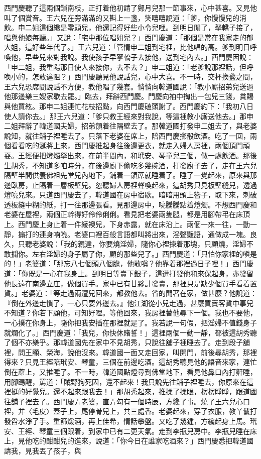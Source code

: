 西門慶聽了這兩個鎖南枝，正打着他初請了鄭月兒那一節事來，心中甚喜。又見他叫了個賞音。王六兒在旁滿滿的又斟上一盞，笑嘻嘻說道：「爹，你慢慢兒的消飲。申二姐這個纔是零頭兒，他還記得好些小令兒哩。到明日閒了，拏轎子接了，唱與他娘每聽。」又說：「宅中那位唱姐兒？」西門慶道：「那個是常在我家走的郁大姐，這好些年代了。」王六兒道：「管情申二姐到宅裡，比他唱的高。爹到明日呼喚他，早些兒來對我說。我使孩子早拏轎子去接他，送到宅內去。」西門慶因說：「申二姐，我重陽那日使人來接你，去不去？」申二姐道：「老爹說那裡話，但呼喚小的，怎敢違阻？」西門慶聽見他說話兒，心中大喜。不一時，交杯換盞之間，王六兒恐席間說話不方便，教他唱了幾套。悄悄向韓道國說：「教小廝招弟兒送過他那邊樂三嫂家歇去罷。」臨去，拜辭西門慶。門慶向袖中掏出一包兒三錢，賞賜與他買絃。那申二姐連忙花枝招颭，向西門慶磕頭謝了。西門慶約下：「我初八日使人請你去。」那王六兒道：「爹只教王經來對我說，等這裡教小廝送他去。」那申二姐拜辭了韓道國夫婦，招弟領着往隔壁去了。那韓道國打發申二姐去了，與老婆說知，就往舖子裡睡去了。只落下老婆在席上，陪西門慶擲骰飲酒。吃了一回，兩個看看吃的涎將上來，西門慶推起身往後邊更衣，就走入婦人房裡，兩個頂門頑耍。王經便把燈燭拏出來，在前半間內，和玳安、琴童兒三個，做一處飲酒。那後生胡秀，不知道多咱時分，在後邊廚下偷吃多幾碗酒，打發廚子去了，走在王六兒隔壁半間供養佛祖先堂兒內地下，鋪着一領蓆就睡着了。睡了一覺起來，原來與那邊臥房，止隔着一層板壁兒。忽聽婦人房裡聲喚起來，這胡秀只見板壁縫兒，透過燈喨兒來。只道西門慶去了，韓道國在房中宿歇。暗暗用頭上簪子，取下來，刺破透板縫中糊的紙，打一往那邊張看。見那邊房中，喨騰騰點着燈燭。不想西門慶和老婆在屋裡，兩個正幹得好伶伶俐俐。看見把老婆兩隻腿，都是用腳帶弔在床頂上。西門慶上身止着一件綾襖兒，下身赤露，就在床沿上。兩個一來一往，一動一靜，搧打的連身响喨。老婆口裡百般言語都叫將出來，淫聲豔語，通做成一塊。良久，只聽老婆說：「我的親達，你要燒淫婦，隨你心裡揀着那塊，只顧燒，淫婦不敢攔你。左右淫婦的身子屬了你，顧的那些兒了。」西門慶道：「只怕你家裡的嗔是的！」老婆道：「那忘八七個頭八個膽，他敢嗔？他靠着那裡過日子哩！」西門慶道：「你既是一心在我身上。到明日等賣下銀子，這遭打發他和來保起身，亦發留他長遠在南邊立庄，做個買手。家中已有甘夥計發賣，那裡只是缺少個買手看着置貨。」老婆道：「等走過兩遭兒回來，都教他去。省的閒著在家，做甚麼？他說道：『倒在外邊走慣了，一心只要外邊去。』他江湖從小兒走過，甚麼買賣客貨中事兒不知道？你若下顧他，可知好哩。等他回來，我房裡替他尋下一個。我也不要他，一心撲在你身上，隨你把我安插在那裡就是了。我若說一句假，把淫婦不值錢身子就爛化了。」西門慶道：「我兒，你快休賭誓！」這裡兩個一動一靜，都被這胡秀聽了個不亦樂乎。那韓道國先在家中不見胡秀，只說往舖子裡睡去了。走到段子舖裡，問王顯、榮海，說他沒來。韓道國一面又走回家，叫開門，前後尋胡秀，那裡得來？只見王經陪玳安、琴童，三個在前邊吃酒。這胡秀聽見他的語音來家，連忙倒在蓆上，又推睡了。不一時，韓道國點燈尋到佛堂地下，看見他鼻口內打鼾睡，用腳踢醒，罵道：「賊野狗死囚，還不起來！我只說先往舖子裡睡去，你原來在這裡挺的好覺兒。還不起來跟我去！」那胡秀起來，推揉了揉眼，楞楞睜睜，跟道國往舖子裡去了。西門慶弄老婆，直弄勾有一個時辰，方纔了事。燒了王六兒心口裡，并〈毛皮〉蓋子上，尾停骨兒上，共三處香。老婆起來，穿了衣服，教丫鬟打發舀水淨了手。重篩煖酒，再上佳希，情話攀盤。又吃了幾鍾，方纔起身上馬。玳安、王經、琴童三個跟着，到家中已有二更天氣。走到李瓶兒房中。李瓶兒睡在床上，見他吃的酣酣兒的進來，說道：「你今日在誰家吃酒來？」西門慶悉把韓道國請我，見我丟了孩子，與